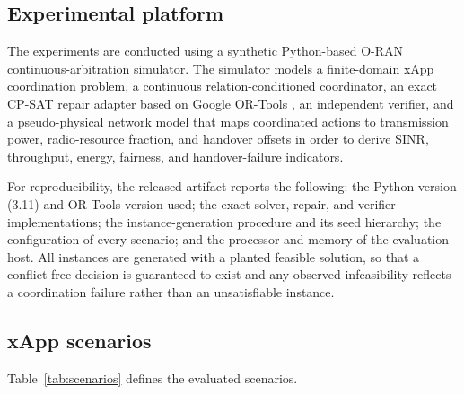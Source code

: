 \documentclass[pdflatex,sn-mathphys-num,iicol,oneside]{sn-jnl}
\begin{document}
\subsection{Experimental platform}

The experiments are conducted using a synthetic Python-based O-RAN
continuous-arbitration simulator. The simulator models a finite-domain
xApp coordination problem, a continuous relation-conditioned coordinator,
an exact CP-SAT repair adapter based on Google OR-Tools \cite{ortools}, an
independent verifier, and a pseudo-physical network model that maps
coordinated actions to transmission power, radio-resource fraction, and
handover offsets in order to derive SINR, throughput, energy, fairness,
and handover-failure indicators.

For reproducibility, the released artifact reports the following: the
Python version (3.11) and OR-Tools version used; the exact solver, repair,
and verifier implementations; the instance-generation procedure and its
seed hierarchy; the configuration of every scenario; and the processor and
memory of the evaluation host. All instances are generated with a planted
feasible solution, so that a conflict-free decision is guaranteed to exist
and any observed infeasibility reflects a coordination failure rather than
an unsatisfiable instance.

\subsection{xApp scenarios}

Table~\ref{tab:scenarios} defines the evaluated scenarios.
\end{document}
